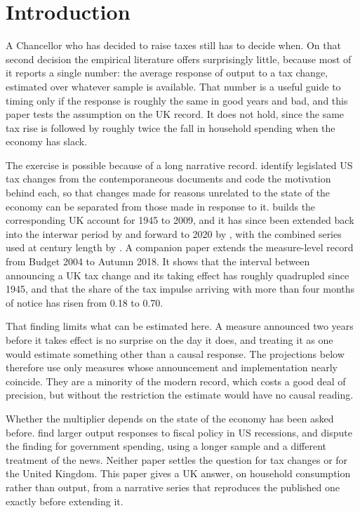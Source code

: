 \documentclass[11pt,a4paper]{article}
\begin{document}
\vspace{1em}

\section{Introduction}

A Chancellor who has decided to raise taxes still has to decide when. On that second decision the
empirical literature offers surprisingly little, because most of it reports a single number: the
average response of output to a tax change, estimated over whatever sample is available. That number
is a useful guide to timing only if the response is roughly the same in good years and bad, and this
paper tests the assumption on the UK record. It does not hold, since the same tax rise is followed
by roughly twice the fall in household spending when the economy has slack.

The exercise is possible because of a long narrative record. \citet{romer2010} identify legislated US
tax changes from the contemporaneous documents and code the motivation behind each, so that changes
made for reasons unrelated to the state of the economy can be separated from those made in response
to it. \citet{cloyne2013} builds the corresponding UK account for 1945 to 2009, and it has since been
extended back into the interwar period by \citet{cloyne2023} and forward to 2020 by
\citet{hurtgen2024}, with the combined series used at century length by \citet{cloyne2025}. A companion paper
\citep{conway2021} extends the measure-level record from Budget 2004 to Autumn 2018. It shows that
the interval between announcing a UK tax change and its taking effect has roughly quadrupled since
1945, and that the share of the tax impulse arriving with more than four months of notice has risen
from 0.18 to 0.70.

That finding limits what can be estimated here. A measure announced two years before it takes effect
is no surprise on the day it does, and treating it as one would estimate something other than a
causal response. The projections below therefore use only measures whose announcement and
implementation nearly coincide. They are a minority of the modern record, which costs a good deal of
precision, but without the restriction the estimate would have no causal reading.

Whether the multiplier depends on the state of the economy has been asked before. \citet{auerbach2012} find larger output responses to fiscal policy in US recessions, and
\citet{ramey2018} dispute the finding for government spending, using a longer sample and a different
treatment of the news. Neither paper settles the question for tax changes or for the United Kingdom.
This paper gives a UK answer, on household consumption rather than output, from a narrative series
that reproduces the published one exactly before extending it.
\end{document}
